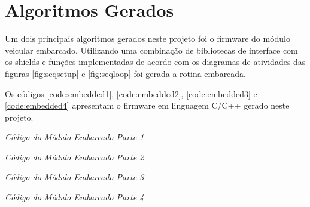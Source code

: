 \section{Algoritmos Gerados}

Um dois principais algoritmos gerados neste projeto foi o firmware do módulo veicular embarcado. Utilizando uma combinação de bibliotecas de interface com os shields e funções implementadas de acordo com os diagramas de atividades das figuras \ref{fig:seqsetup} e \ref{fig:seqloop} foi gerada a rotina embarcada.

Os códigos \ref{code:embedded1}, \ref{code:embedded2}, \ref{code:embedded3} e \ref{code:embedded4} apresentam o firmware em linguagem C/C++ gerado neste projeto.  

\renewcommand{\baselinestretch}{0.5}  %
\begin{codigo}[htb]
\fontsize{9pt}{9pt}\selectfont
      \begin{boxit}  %
      \vspace{2mm}
   \end{boxit}
   \caption{\it Código do Módulo Embarcado Parte 1}
   \label{code:embedded1}
\end{codigo}

\renewcommand{\baselinestretch}{0.5}  %
\begin{codigo}[htb]
\fontsize{9pt}{9pt}\selectfont
      \begin{boxit}  %
      \vspace{2mm}
   \end{boxit}
   \caption{\it Código do Módulo Embarcado Parte 2}
   \label{code:embedded2}
\end{codigo}

\renewcommand{\baselinestretch}{0.5}  %
\begin{codigo}[htb]
\fontsize{9pt}{9pt}\selectfont
      \begin{boxit}  %
      \vspace{2mm}
   \end{boxit}
   \caption{\it Código do Módulo Embarcado Parte 3}
   \label{code:embedded3}
\end{codigo}

\renewcommand{\baselinestretch}{0.5}  %
\begin{codigo}[htb]
\fontsize{9pt}{9pt}\selectfont
      \begin{boxit}  %
      \vspace{2mm}
   \end{boxit}
   \caption{\it Código do Módulo Embarcado Parte 4}
   \label{code:embedded4}
\end{codigo}
